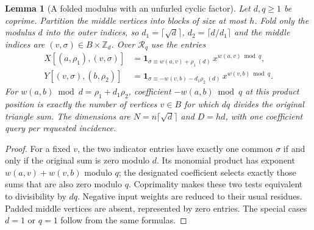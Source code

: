 \documentclass[11pt]{article}
\newtheorem{lemma}[theorem]{Lemma}
\begin{document}
\begin{lemma}[A folded modulus with an unfurled cyclic factor]
\label{lem:folded-cyclic-factor}
Let $d,q\ge1$ be coprime. Partition the middle vertices into blocks of
size at most $h$. Fold only the modulus $d$ into the outer indices, so
$d_1=\lceil\sqrt d\rceil$, $d_2=\lceil d/d_1\rceil$ and the middle
indices are $(v,\sigma)\in B\times\mathbb Z_d$. Over $\mathcal R_q$
use the entries
\begin{align*}
 X[(a,\rho_1),(v,\sigma)]
 &=\boldsymbol1_{\sigma\equiv w(a,v)+\rho_1\ (d)}\,x^{w(a,v)\bmod q},\\
 Y[(v,\sigma),(b,\rho_2)]
 &=\boldsymbol1_{\sigma\equiv-w(v,b)-d_1\rho_2\ (d)}\,x^{w(v,b)\bmod q}.
\end{align*}
For $w(a,b)\bmod d=\rho_1+d_1\rho_2$, coefficient
$-w(a,b)\bmod q$ at this product position is exactly the number of
vertices $v\in B$ for which $dq$ divides the original triangle sum.
The dimensions are $N=n\lceil\sqrt d\rceil$ and $D=hd$, with one
coefficient query per requested incidence.
\end{lemma}
\begin{proof}
For a fixed $v$, the two indicator entries have exactly one common
$\sigma$ if and only if the original sum is zero modulo $d$.
Its monomial product has exponent $w(a,v)+w(v,b)$ modulo $q$; the
designated coefficient selects exactly those sums that are also zero
modulo $q$. Coprimality makes these two tests equivalent to divisibility
by $dq$. Negative input weights are reduced to their usual residues.
Padded middle vertices are absent, represented by zero entries.
The special cases $d=1$ or $q=1$ follow from the same formulas.
\end{proof}
\end{document}

